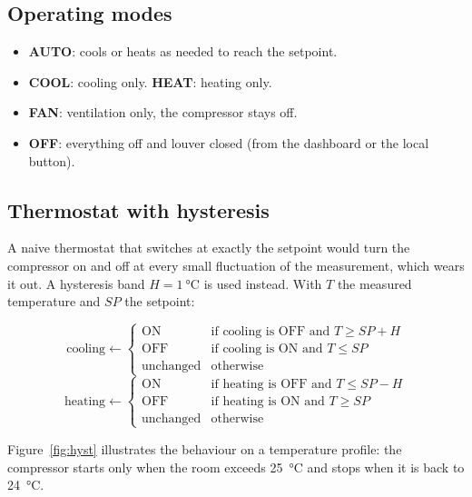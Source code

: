 \documentclass[11pt,a4paper]{article}
\begin{document}
\subsection{Operating modes}
\begin{itemize}
  \item \textbf{AUTO}: cools or heats as needed to reach the setpoint.
  \item \textbf{COOL}: cooling only. \quad \textbf{HEAT}: heating only.
  \item \textbf{FAN}: ventilation only, the compressor stays off.
  \item \textbf{OFF}: everything off and louver closed (from the dashboard or the local button).
\end{itemize}

\subsection{Thermostat with hysteresis}
A naive thermostat that switches at exactly the setpoint would turn the compressor on and off
at every small fluctuation of the measurement, which wears it out. A hysteresis band
$H = \SI{1}{\celsius}$ is used instead. With $T$ the measured temperature and $SP$ the setpoint:

\[
\text{cooling} \leftarrow
\begin{cases}
\text{ON}  & \text{if cooling is OFF and } T \ge SP + H\\
\text{OFF} & \text{if cooling is ON and } T \le SP\\
\text{unchanged} & \text{otherwise}
\end{cases}
\]
\[
\text{heating} \leftarrow
\begin{cases}
\text{ON}  & \text{if heating is OFF and } T \le SP - H\\
\text{OFF} & \text{if heating is ON and } T \ge SP\\
\text{unchanged} & \text{otherwise}
\end{cases}
\]


Figure~\ref{fig:hyst} illustrates the behaviour on a temperature profile: the compressor starts
only when the room exceeds \SI{25}{\celsius} and stops when it is back to \SI{24}{\celsius}.
\end{document}

